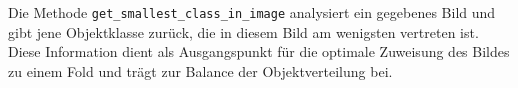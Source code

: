 Die Methode \texttt{get\_smallest\_class\_in\_image} analysiert ein gegebenes Bild und gibt jene Objektklasse zurück, die in diesem Bild am wenigsten vertreten ist. Diese Information dient als Ausgangspunkt für die optimale Zuweisung des Bildes zu einem Fold und trägt zur Balance der Objektverteilung bei.


